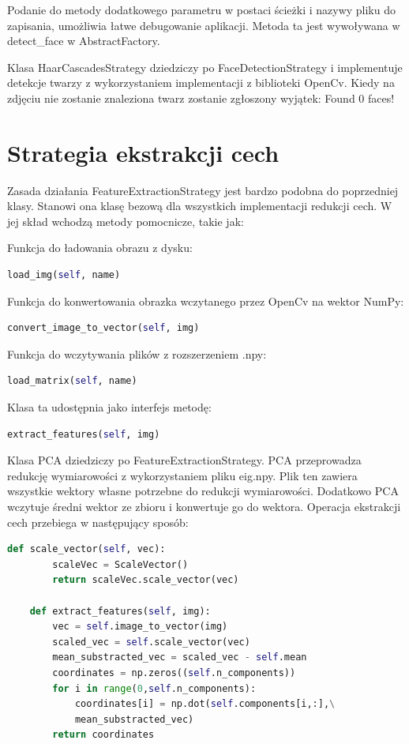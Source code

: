 \documentclass[oneside, eng]{mgr}
\begin{document}
Podanie do metody dodatkowego parametru w postaci ścieżki i nazywy pliku do zapisania, umożliwia łatwe debugowanie aplikacji. Metoda ta jest wywoływana w detect\_face w AbstractFactory.

Klasa HaarCascadesStrategy dziedziczy po FaceDetectionStrategy i implementuje detekcje twarzy z wykorzystaniem implementacji z biblioteki OpenCv. Kiedy na zdjęciu nie zostanie znaleziona twarz zostanie zgłoszony wyjątek: Found 0 faces!

\section{Strategia ekstrakcji cech}

Zasada działania FeatureExtractionStrategy jest bardzo podobna do poprzedniej klasy. Stanowi ona klasę bezową dla wszystkich implementacji redukcji cech. W jej skład wchodzą metody pomocnicze, takie jak:

Funkcja do ładowania obrazu z dysku:

\begin{lstlisting}[language=Python]
	load_img(self, name)
\end{lstlisting}

Funkcja do konwertowania obrazka wczytanego przez OpenCv na wektor NumPy:

\begin{lstlisting}[language=Python]
	convert_image_to_vector(self, img)
\end{lstlisting}

Funkcja do wczytywania plików z rozszerzeniem .npy: 
	
\begin{lstlisting}[language=Python]
	load_matrix(self, name)
\end{lstlisting}

Klasa ta udostępnia jako interfejs metodę:

\begin{lstlisting}[language=Python]
    extract_features(self, img)
\end{lstlisting}

Klasa PCA dziedziczy po FeatureExtractionStrategy. PCA przeprowadza redukcję wymiarowości z wykorzystaniem pliku eig.npy. Plik ten zawiera wszystkie wektory własne potrzebne do redukcji wymiarowości. Dodatkowo PCA wczytuje średni wektor ze zbioru i konwertuje go do wektora. Operacja ekstrakcji cech przebiega w następujący sposób:

\begin{lstlisting}[language=Python]
    def scale_vector(self, vec):
        scaleVec = ScaleVector()
        return scaleVec.scale_vector(vec)

    def extract_features(self, img):
        vec = self.image_to_vector(img)
        scaled_vec = self.scale_vector(vec)
        mean_substracted_vec = scaled_vec - self.mean
        coordinates = np.zeros((self.n_components))
        for i in range(0,self.n_components):
            coordinates[i] = np.dot(self.components[i,:],\
            mean_substracted_vec)
        return coordinates
\end{lstlisting}
\end{document}
